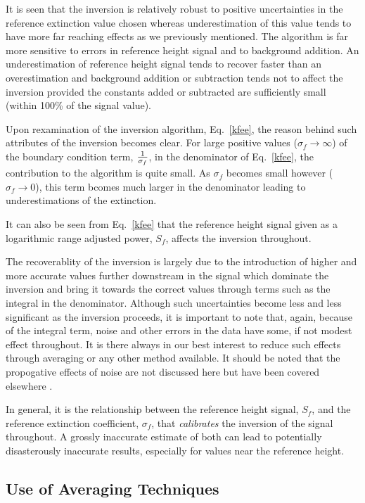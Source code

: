 It is seen that the inversion is relatively robust to 
positive uncertainties in the reference extinction value chosen
whereas underestimation of this value tends to have more far reaching 
effects as we previously mentioned. The algorithm is far more
sensitive to errors in reference height signal and to background addition.
An underestimation of reference height signal tends to recover
faster than an overestimation and background addition or
subtraction tends not to affect the inversion provided
the constants added or subtracted are sufficiently small
(within 100\% of the signal value).

Upon rexamination of the inversion algorithm, 
Eq.~{\ref{kfee}}, the reason behind 
such attributes of the inversion becomes clear. For large
positive values ($\sigma_{f}\rightarrow\infty$) 
of the boundary condition term, 
$1\over{\sigma_{f}}$, in the denominator
of Eq.~{\ref{kfee}}, the contribution to the algorithm
is quite small. As $\sigma_f$ becomes small however ($\sigma_{f}\rightarrow 0$),
this term bcomes much larger in the denominator leading
to underestimations of the extinction.

It can also be seen from Eq.~{\ref{kfee}} that the 
reference height signal given as 
a logarithmic range adjusted power, $S_{f}$, affects
the inversion throughout. 

The recoverablity of the inversion is largely due to the 
introduction of higher and more accurate values further
downstream in the signal which dominate the inversion 
and bring it towards
the correct values through terms such as the integral in the
denominator. Although such uncertainties become less and
less significant as the inversion proceeds, it is important
to note that, again, because of the integral term, noise
and other errors in the data have some, if not modest 
effect throughout. It is there always in our best interest 
to reduce such effects through averaging or any other method available.
It should be noted that the propogative effects of noise are not
discussed here but have been covered elsewhere \cite{jdk1}.

In general, it is the relationship between the reference height signal, 
$S_{f}$, and the reference extinction coefficient, $\sigma_{f}$,
that {\em calibrates} the inversion of the signal throughout.
A grossly inaccurate estimate of both can lead to potentially disasterously
inaccurate results, especially for values near the reference height.

\subsection{Use of Averaging Techniques}

